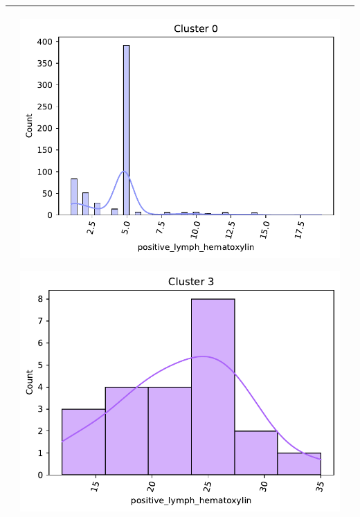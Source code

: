 \begin{table}[htb!]
\begin{threeparttable}
\begin{tabular}{p{2.5cm} p{7cm} p{6.5cm}}
			& 
			\begin{center}\includegraphics[width=1\linewidth]{NOTEBOOK/IMAGENES_BIRCH_CLUSTERING/7_Cluster_0_positive_lymph_hematoxylin}\end{center}
			\begin{center}\includegraphics[width=1\linewidth]{NOTEBOOK/IMAGENES_BIRCH_CLUSTERING/7_Cluster_3_positive_lymph_hematoxylin}\end{center}
			
			\\ \hline
		\end{tabular}
	\end{threeparttable}
\end{table}

